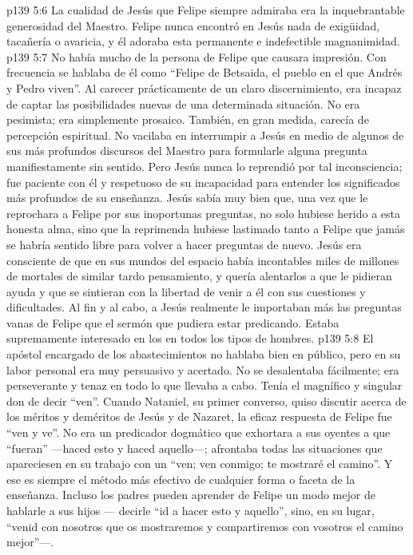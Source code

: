 \vs p139 5:6 La cualidad de Jesús que Felipe siempre admiraba era la inquebrantable generosidad del Maestro. Felipe nunca encontró en Jesús nada de exigüidad, tacañería o avaricia, y él adoraba esta permanente e indefectible magnanimidad.
\vs p139 5:7 \pc No había mucho de la persona de Felipe que causara impresión. Con frecuencia se hablaba de él como “Felipe de Betsaida, el pueblo en el que Andrés y Pedro viven”. Al carecer prácticamente de un claro discernimiento, era incapaz de captar las posibilidades nuevas de una determinada situación. No era pesimista; era simplemente prosaico. También, en gran medida, carecía de percepción espiritual. No vacilaba en interrumpir a Jesús en medio de algunos de sus más profundos discursos del Maestro para formularle alguna pregunta manifiestamente sin sentido. Pero Jesús nunca lo reprendió por tal inconsciencia; fue paciente con él y respetuoso de su incapacidad para entender los significados más profundos de su enseñanza. Jesús sabía muy bien que, una vez que le reprochara a Felipe por sus inoportunas preguntas, no solo hubiese herido a esta honesta alma, sino que la reprimenda hubiese lastimado tanto a Felipe que jamás se habría sentido libre para volver a hacer preguntas de nuevo. Jesús era consciente de que en sus mundos del espacio había incontables miles de millones de mortales de similar tardo pensamiento, y quería alentarlos a que le pidieran ayuda y que se sintieran con la libertad de venir a él con sus cuestiones y dificultades. Al fin y al cabo, a Jesús realmente le importaban más las preguntas vanas de Felipe que el sermón que pudiera estar predicando. Estaba supremamente interesado en los  en todos los tipos de hombres.
\vs p139 5:8 El apóstol encargado de los abastecimientos no hablaba bien en público, pero en su labor personal era muy persuasivo y acertado. No se desalentaba fácilmente; era perseverante y tenaz en todo lo que llevaba a cabo. Tenía el magnífico y singular don de decir “ven”. Cuando Nataniel, su primer converso, quiso discutir acerca de los méritos y deméritos de Jesús y de Nazaret, la eficaz respuesta de Felipe fue “ven y ve”. No era un predicador dogmático que exhortara a sus oyentes a que “fueran” ---haced esto y haced aquello---; afrontaba todas las situaciones que apareciesen en su trabajo con un “ven; ven conmigo; te mostraré el camino”. Y ese es siempre el método más efectivo de cualquier forma o faceta de la enseñanza. Incluso los padres pueden aprender de Felipe un modo mejor de hablarle a sus hijos --- decirle “id a hacer esto y aquello”, sino, en su lugar, “venid con nosotros que os mostraremos y compartiremos con vosotros el camino mejor”---.
